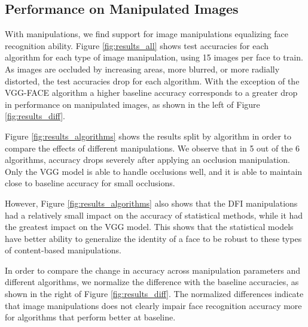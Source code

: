 \documentclass[pageno]{cos429}
\begin{document}
\subsection*{Performance on Manipulated Images}
With manipulations, we find support for image manipulations equalizing face recognition ability. Figure \ref{fig:results_all} shows test accuracies for each algorithm for each type of image manipulation, using 15 images per face to train. As images are occluded by increasing areas, more blurred, or more radially distorted, the test accuracies drop for each algorithm. With the exception of the VGG-FACE algorithm a higher baseline accuracy corresponds to a greater drop in performance on manipulated images, as shown in the left of Figure \ref{fig:results_diff}.

Figure \ref{fig:results_algorithms} shows the results split by algorithm in order to compare the effects of different manipulations. We observe that in 5 out of the 6 algorithms, accuracy drops severely after applying an occlusion manipulation. Only the VGG model is able to handle occlusions well, and it is able to maintain close to baseline accuracy for small occlusions.

However, Figure \ref{fig:results_algorithms} also shows that the DFI manipulations had a relatively small impact on the accuracy of statistical methods, while it had the greatest impact on the VGG model. This shows that the statistical models have better ability to generalize the identity of a face to be robust to these types of content-based manipulations.

In order to compare the change in accuracy across manipulation parameters and different algorithms, we normalize the difference with the baseline accuracies, as shown in the right of Figure \ref{fig:results_diff}. The normalized differences indicate that image manipulations does not clearly impair face recognition accuracy more for algorithms that perform better at baseline.
\end{document}
